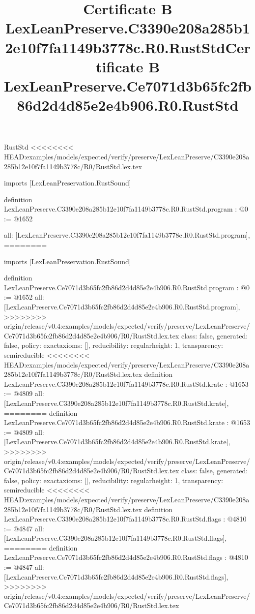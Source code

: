 \begin{lexlean}{RustStd}
<<<<<<<< HEAD:examples/models/expected/verify/preserve/LexLeanPreserve/C3390e208a285b12e10f7fa1149b3778c/R0/RustStd.lex.tex
\title{Certificate B LexLeanPreserve.C3390e208a285b12e10f7fa1149b3778c.R0.RustStd}
\begin{coremodule}
imports [LexLeanPreservation.RustSound]

definition LexLeanPreserve.C3390e208a285b12e10f7fa1149b3778c.R0.RustStd.program : @0 := @1652 {
  all: [LexLeanPreserve.C3390e208a285b12e10f7fa1149b3778c.R0.RustStd.program],
========
\title{Certificate B LexLeanPreserve.Ce7071d3b65fc2fb86d2d4d85e2e4b906.R0.RustStd}
\begin{coremodule}
imports [LexLeanPreservation.RustSound]

definition LexLeanPreserve.Ce7071d3b65fc2fb86d2d4d85e2e4b906.R0.RustStd.program : @0 := @1652 {
  all: [LexLeanPreserve.Ce7071d3b65fc2fb86d2d4d85e2e4b906.R0.RustStd.program],
>>>>>>>> origin/release/v0.4:examples/models/expected/verify/preserve/LexLeanPreserve/Ce7071d3b65fc2fb86d2d4d85e2e4b906/R0/RustStd.lex.tex
  class: false,
  generated: false,
  policy: exact{axioms: []},
  reducibility: regular{height: 1},
  transparency: semireducible
}
<<<<<<<< HEAD:examples/models/expected/verify/preserve/LexLeanPreserve/C3390e208a285b12e10f7fa1149b3778c/R0/RustStd.lex.tex
definition LexLeanPreserve.C3390e208a285b12e10f7fa1149b3778c.R0.RustStd.krate : @1653 := @4809 {
  all: [LexLeanPreserve.C3390e208a285b12e10f7fa1149b3778c.R0.RustStd.krate],
========
definition LexLeanPreserve.Ce7071d3b65fc2fb86d2d4d85e2e4b906.R0.RustStd.krate : @1653 := @4809 {
  all: [LexLeanPreserve.Ce7071d3b65fc2fb86d2d4d85e2e4b906.R0.RustStd.krate],
>>>>>>>> origin/release/v0.4:examples/models/expected/verify/preserve/LexLeanPreserve/Ce7071d3b65fc2fb86d2d4d85e2e4b906/R0/RustStd.lex.tex
  class: false,
  generated: false,
  policy: exact{axioms: []},
  reducibility: regular{height: 1},
  transparency: semireducible
}
<<<<<<<< HEAD:examples/models/expected/verify/preserve/LexLeanPreserve/C3390e208a285b12e10f7fa1149b3778c/R0/RustStd.lex.tex
definition LexLeanPreserve.C3390e208a285b12e10f7fa1149b3778c.R0.RustStd.flags : @4810 := @4847 {
  all: [LexLeanPreserve.C3390e208a285b12e10f7fa1149b3778c.R0.RustStd.flags],
========
definition LexLeanPreserve.Ce7071d3b65fc2fb86d2d4d85e2e4b906.R0.RustStd.flags : @4810 := @4847 {
  all: [LexLeanPreserve.Ce7071d3b65fc2fb86d2d4d85e2e4b906.R0.RustStd.flags],
>>>>>>>> origin/release/v0.4:examples/models/expected/verify/preserve/LexLeanPreserve/Ce7071d3b65fc2fb86d2d4d85e2e4b906/R0/RustStd.lex.tex
}}}
\end{coremodule}}
\end{coremodule}
\end{lexlean}
